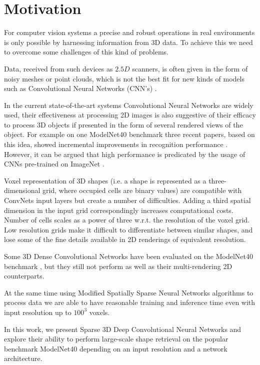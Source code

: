 \section{Motivation}

For computer vision systems a precise and robust operations in real environments is only possible by harnessing information from 3D data. To achieve this we need to overcome some challenges of this kind of problems.

Data, received from such devices as $2.5D$ scanners, is often given in the form of noisy meshes or point clouds, which is not the best fit for new kinds of models such as Convolutional Neural Networks (CNN's) \cite{lecun1995convolutional}.

In the current state-of-the-art systems Convolutional Neural Networks are widely used, their effectiveness at processing 2D images is also suggestive of their efficacy to process 3D objects if presented in the form of several rendered views of the object. For example on one ModelNet40 \cite{wu20153d} benchmark three recent papers, based on this idea, showed incremental improvements in recognition performance \cite{su15mvcnn,johns2016pairwise,hegde2016fusionnet}. However, it can be argued that high performance is predicated by the usage of CNNs pre-trained on ImageNet \cite{deng2009imagenet}.

Voxel representation of 3D shapes (i.e. a shape is represented as a three-dimensional grid, where occupied cells are binary values) are compatible with ConvNets input layers but create a number of difficulties.
Adding a third spatial dimension in the input grid correspondingly increases computational costs. Number of cells scales as a power of three w.r.t. the resolution of the voxel grid. Low resolution grids make it difficult to differentiate between similar shapes, and lose some of the fine details available in 2D renderings of equivalent resolution.

Some 3D Dense Convolutional Networks have been evaluated on the ModelNet40 benchmark \cite{maturana2015voxnet,sedaghat2016orientation,wu20153d,brock2016generative}, but they still not perform as well as their multi-rendering 2D counterparts.

At the same time using Modified Spatially Sparse Neural Networks algorithms \cite{graham2014spatially} to process data we are able to have reasonable training and inference time even with input resolution up to $100^3$ voxels.

In this work, we present Sparse 3D Deep Convolutional Neural Networks and explore their ability to perform large-scale shape retrieval on the popular benchmark ModelNet40 \cite{wu20153d} depending on an input resolution and a network architecture.

